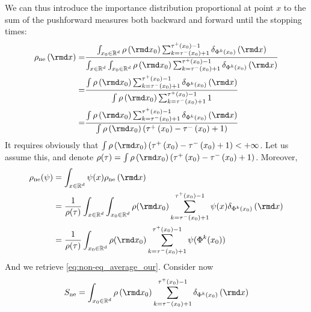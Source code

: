 We can thus introduce the importance distribution proportional at point $x$ to the sum of the pushforward measures both backward and forward until the stopping times:
\begin{align*}
\rho_{\mathrm{ne}}\left(\rmd x\right)= & \frac{\int_{x_0\in \mathbb{R}^{d}}\rho\left(\rmd x_{0}\right)\sum_{k=\tau^{-}\left(x_{0}\right)+1}^{\tau^{+}\left(x_{0}\right)-1}\delta_{\Phi^{k}(x_{0})}\left(\rmd x\right) }{\int_{x\in \mathbb{R}^d}\int_{x_0\in \mathbb{R}^{d}}\rho\left(\rmd x_{0}\right)\sum_{k=\tau^{-}\left(x_{0}\right)+1}^{\tau^{+}\left(x_{0}\right)-1}\delta_{\Phi^{k}(x_{0})}\left(\rmd x\right)}\\
= & \frac{\int\rho\left(\rmd x_{0}\right)\sum_{k=\tau^{-}\left(x_{0}\right)+1}^{\tau^{+}\left(x_{0}\right)-1}\delta_{\Phi^{k}(x_{0})}\left(\rmd x\right) }{\int\rho\left(\rmd x_{0}\right)\sum_{k=\tau^{-}\left(x_{0}\right)+1}^{\tau^{+}\left(x_{0}\right)-1}1 }\\
= & \frac{\int\rho\left(\rmd x_{0}\right)\sum_{k=\tau^{-}\left(x_{0}\right)+1}^{\tau^{+}\left(x_{0}\right)-1}\delta_{\Phi^{k}(x_{0})}\left(\rmd x\right) }{\int\rho\left(\rmd x_{0}\right)(\tau^{+}\left(x_{0}\right) - \tau^{-}\left(x_{0}\right) +1)}\\
\end{align*}
It requires obviously that $\int\rho\left(\rmd x_{0}\right)(\tau^{+}\left(x_{0}\right) - \tau^{-}\left(x_{0}\right) +1)< +\infty$. Let us assume this, and denote $\rho(\tau)=\int\rho\left(\rmd x_{0}\right)(\tau^{+}\left(x_{0}\right) - \tau^{-}\left(x_{0}\right) +1) $. 
Moreover, 
\begin{align*}
    \rho_{\mathrm{ne}}(\psi) &= \int_{x\in \mathbb{R}^{d}} \psi(x) \rho_{\mathrm{ne}}\left(\rmd x\right) \\
    &=  \frac{1}{\rho(\tau)} \int_{x\in \mathbb{R}^{d}} \int_{x_0\in \mathbb{R}^{d}} \rho(\rmd x_0) \sum_{k=\tau^{-}\left(x_{0}\right)+1}^{\tau^{+}\left(x_{0}\right)-1} \psi(x)\delta_{\Phi^{k}(x_{0})}\left(\rmd x\right)\\
    &=  \frac{1}{\rho(\tau)}\int_{x_0\in \mathbb{R}^{d}} \rho(\rmd x_0) \sum_{k=\tau^{-}\left(x_{0}\right)+1}^{\tau^{+}\left(x_{0}\right)-1} \psi(\Phi^{k}(x_{0}))
\end{align*}
And we retrieve \eqref{eq:non-eq_average_our}. Consider now 
\begin{align*}
    S_{\mathrm{ne}}=\int_{x_0\in\mathbb{R}^{d}}\rho\left(\rmd x_{0}\right)\sum_{k=\tau^{-}\left(x_{0}\right)+1}^{\tau^{+}\left(x_{0}\right)-1}\delta_{\Phi^{k}(x_{0})}\left(\rmd x\right)
\end{align*}
